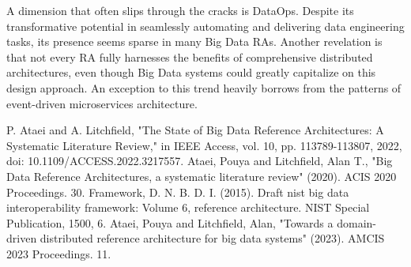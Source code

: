 \documentclass[conference]{IEEEtran}
\begin{document}
A dimension that often slips through the cracks is DataOps. Despite its transformative potential in seamlessly automating and delivering data engineering tasks, its presence seems sparse in many Big Data RAs. Another revelation is that not every RA fully harnesses the benefits of comprehensive distributed architectures, even though Big Data systems could greatly capitalize on this design approach. An exception to this trend heavily borrows from the patterns of event-driven microservices architecture.

\begin{thebibliography}{00}


 P. Ataei and A. Litchfield, "The State of Big Data Reference Architectures: A Systematic Literature Review," in IEEE Access, vol. 10, pp. 113789-113807, 2022, doi: 10.1109/ACCESS.2022.3217557.
 Ataei, Pouya and Litchfield, Alan T., "Big Data Reference Architectures, a systematic literature review" (2020). ACIS 2020 Proceedings. 30.
 Framework, D. N. B. D. I. (2015). Draft nist big data interoperability framework: Volume 6, reference architecture. NIST Special Publication, 1500, 6.
 Ataei, Pouya and Litchfield, Alan, "Towards a domain-driven distributed reference architecture for big data
systems" (2023). AMCIS 2023 Proceedings. 11.


\end{thebibliography}
\end{document}
